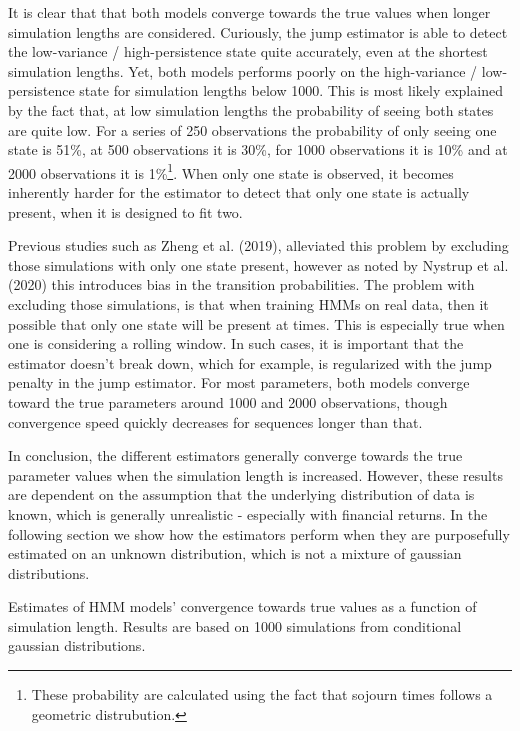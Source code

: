 It is clear that that both models converge towards the true values when longer simulation lengths are considered. Curiously, the jump estimator is able to detect the low-variance / high-persistence state quite accurately, even at the shortest simulation lengths. Yet, both models performs poorly on the high-variance / low-persistence state for simulation lengths below 1000. This is most likely explained by the fact that, at low simulation lengths the probability of seeing both states are quite low. For a series of 250 observations the probability of only seeing one state is 51\%, at 500 observations it is 30\%, for 1000 observations it is 10\% and at 2000 observations it is 1\%\footnote
{These probability are calculated using the fact that sojourn times follows a geometric distrubution.
}. 
When only one state is observed, it becomes inherently harder for the estimator to detect that only one state is actually present, when it is designed to fit two.

Previous studies such as Zheng et al. (2019), alleviated this problem by excluding those simulations with only one state present, however as noted by Nystrup et al. (2020) this introduces bias in the transition probabilities. The problem with excluding those simulations, is that when training HMMs on real data, then it possible that only one state will be present at times. This is especially true when one is considering a rolling window. In such cases, it is important that the estimator doesn't break down, which for example, is regularized with the jump penalty in the jump estimator. For most parameters, both models converge toward the true parameters around 1000 and 2000 observations, though convergence speed quickly decreases for sequences longer than that.

In conclusion, the different estimators generally converge towards the true parameter values when the simulation length is increased. However, these results are dependent on the assumption that the underlying distribution of data is known, which is generally unrealistic - especially with financial returns. In the following section we show how the estimators perform when they are purposefully estimated on an unknown distribution, which is not a mixture of gaussian distributions.


\begin{table}[H]
\centering
\caption{Estimates of HMM models' convergence towards true values as a function of simulation length. Results are based on 1000 simulations from conditional gaussian distributions.}

\label{tab:jump_gaussian}
\end{table}


